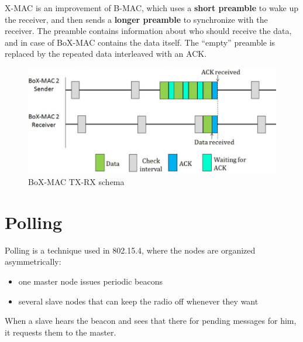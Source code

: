 X-MAC is an improvement of B-MAC, which uses a \textbf{short preamble} to wake up the receiver, and then sends a \textbf{longer preamble} to synchronize with the receiver.
The preamble contains information about who should receive the data, and in case of BoX-MAC contains the data itself. The ``empty'' preamble is replaced by the repeated data interleaved with an ACK.  

\begin{figure}[htbp]
   \centering
   \includegraphics{images/BoXmac.png}
   \caption{BoX-MAC TX-RX schema}
   \label{fig:BoXmac}
\end{figure}

\section{Polling}
Polling is a technique used in 802.15.4, where the nodes are organized asymmetrically:
\begin{itemize}
   \item one master node issues periodic beacons
   \item several slave nodes that can keep the radio off whenever they want
\end{itemize}
When a slave hears the beacon and sees that there for pending messages for him, it requests them to the master.
